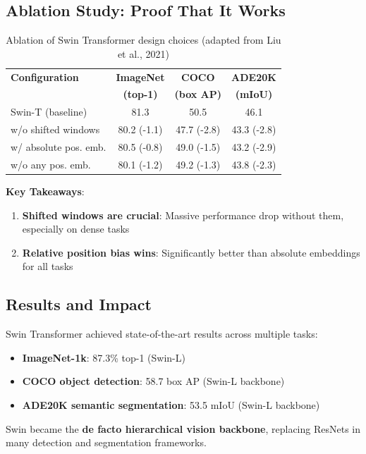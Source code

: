 \documentclass{article}
\begin{document}
\subsection{Ablation Study: Proof That It Works}

\begin{table}[h]
\centering
\begin{tabular}{lccc}
\toprule
\textbf{Configuration} & \textbf{ImageNet} & \textbf{COCO} & \textbf{ADE20K} \\
& \textbf{(top-1)} & \textbf{(box AP)} & \textbf{(mIoU)} \\
\midrule
Swin-T (baseline) & 81.3 & 50.5 & 46.1 \\
w/o shifted windows & 80.2 (-1.1) & 47.7 (-2.8) & 43.3 (-2.8) \\
w/ absolute pos. emb. & 80.5 (-0.8) & 49.0 (-1.5) & 43.2 (-2.9) \\
w/o any pos. emb. & 80.1 (-1.2) & 49.2 (-1.3) & 43.8 (-2.3) \\
\bottomrule
\end{tabular}
\caption{Ablation of Swin Transformer design choices (adapted from Liu et al., 2021)}
\end{table}

\textbf{Key Takeaways}:
\begin{enumerate}
\item \textbf{Shifted windows are crucial}: Massive performance drop without them, especially on dense tasks
\item \textbf{Relative position bias wins}: Significantly better than absolute embeddings for all tasks
\end{enumerate}

\subsection{Results and Impact}

Swin Transformer achieved state-of-the-art results across multiple tasks:

\begin{itemize}
\item \textbf{ImageNet-1k}: 87.3\% top-1 (Swin-L)
\item \textbf{COCO object detection}: 58.7 box AP (Swin-L backbone)
\item \textbf{ADE20K semantic segmentation}: 53.5 mIoU (Swin-L backbone)
\end{itemize}

Swin became the \textbf{de facto hierarchical vision backbone}, replacing ResNets in many detection and segmentation frameworks.
\end{document}
